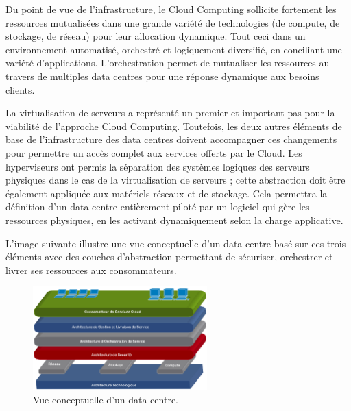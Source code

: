 Du point de vue de l'infrastructure, le Cloud Computing sollicite fortement les ressources mutualisées dans une grande variété de technologies (de compute, de stockage, de réseau) pour leur allocation dynamique. Tout ceci dans un environnement automatisé, orchestré et logiquement diversifié, en conciliant une variété d'applications. L'orchestration permet de mutualiser les ressources au travers de multiples data centres pour une réponse dynamique aux besoins clients. 


La virtualisation de serveurs a représenté un premier et important pas pour la viabilité de l'approche Cloud Computing. Toutefois, les deux autres éléments de base de l'infrastructure des data centres doivent accompagner ces changements pour permettre un accès complet aux services offerts par le Cloud. Les hyperviseurs ont permis la séparation des systèmes logiques des serveurs physiques dans le cas de la virtualisation de serveurs ; cette abstraction doit être également appliquée aux matériels réseaux et de stockage. Cela permettra la définition d'un data centre entièrement piloté par un logiciel qui gère les ressources physiques, en les activant dynamiquement selon la charge applicative.


 L'image suivante illustre une vue conceptuelle d'un data centre basé sur ces trois éléments avec des couches d'abstraction permettant de sécuriser, orchestrer et livrer ses ressources aux consommateurs.\\

\begin{figure}[h]
\begin{center}

\includegraphics[width=0.6\textwidth]{images/CloudRefArchi_T} 
\caption{Vue conceptuelle d'un data centre. \cite{ciscoCCDCStrategyArchiSolutions}} \label{cloud_conceptual_view}

\end{center}
\end{figure}

